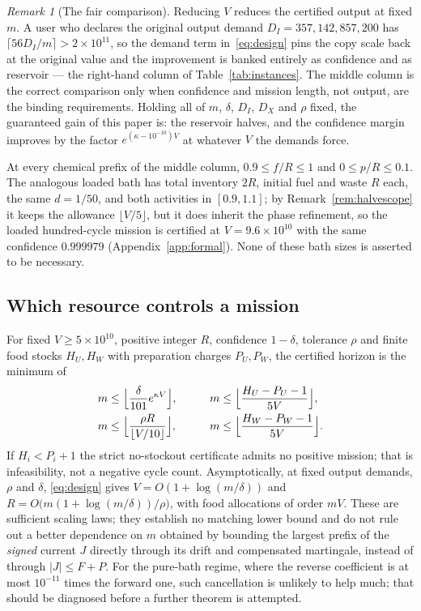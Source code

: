 \documentclass[11pt,a4paper]{article}
\theoremstyle{plain}
\theoremstyle{definition}
\theoremstyle{remark}
\newtheorem{remark}[theorem]{Remark}
\begin{document}
\begin{remark}[The fair comparison]\label{rem:fair}
Reducing $V$ reduces the certified output at fixed $m$. A user who declares the original output demand $D_I=357{,}142{,}857{,}200$ has $\lceil56D_I/m\rceil>2\times10^{11}$, so the demand term in~\eqref{eq:design} pins the copy scale back at the original value and the improvement is banked entirely as confidence and as reservoir --- the right-hand column of Table~\ref{tab:instances}. The middle column is the correct comparison only when confidence and mission length, not output, are the binding requirements. Holding all of $m$, $\delta$, $D_I$, $D_X$ and $\rho$ fixed, the guaranteed gain of this paper is: the reservoir halves, and the confidence margin improves by the factor $e^{(\kappa-10^{-10})V}$ at whatever $V$ the demands force.
\end{remark}

At every chemical prefix of the middle column, $0.9\le f/R\le1$ and $0\le p/R\le0.1$. The analogous loaded bath has total inventory $2R$, initial fuel and waste $R$ each, the same $d=1/50$, and both activities in $[0.9,1.1]$; by Remark~\ref{rem:halvescope} it keeps the allowance $\lfloor V/5\rfloor$, but it does inherit the phase refinement, so the loaded hundred-cycle mission is certified at $V=9.6\times10^{10}$ with the same confidence $0.999979$ (Appendix~\ref{app:formal}). None of these bath sizes is asserted to be necessary.

\subsection{Which resource controls a mission}\label{sec:resource}

For fixed $V\ge5\times10^{10}$, positive integer $R$, confidence $1-\delta$, tolerance $\rho$ and finite food stocks $H_U,H_W$ with preparation charges $P_U,P_W$, the certified horizon is the minimum of
\begin{equation}\label{eq:budget}
\begin{aligned}
m&\le\Bigl\lfloor\frac\delta{101}e^{\kappa V}\Bigr\rfloor, &\qquad
m&\le\Bigl\lfloor\frac{H_U-P_U-1}{5V}\Bigr\rfloor,\\
m&\le\Bigl\lfloor\frac{\rho R}{\lfloor V/10\rfloor}\Bigr\rfloor, &\qquad
m&\le\Bigl\lfloor\frac{H_W-P_W-1}{5V}\Bigr\rfloor .
\end{aligned}
\end{equation}
If $H_i<P_i+1$ the strict no-stockout certificate admits no positive mission; that is infeasibility, not a negative cycle count. Asymptotically, at fixed output demands, $\rho$ and $\delta$, \eqref{eq:design} gives $V=O(1+\log(m/\delta))$ and $R=O\bigl(m(1+\log(m/\delta))/\rho\bigr)$, with food allocations of order $mV$. These are sufficient scaling laws; they establish no matching lower bound and do not rule out a better dependence on $m$ obtained by bounding the largest prefix of the \emph{signed} current $J$ directly through its drift and compensated martingale, instead of through $|J|\le F+P$. For the pure-bath regime, where the reverse coefficient is at most $10^{-11}$ times the forward one, such cancellation is unlikely to help much; that should be diagnosed before a further theorem is attempted.
\end{document}
